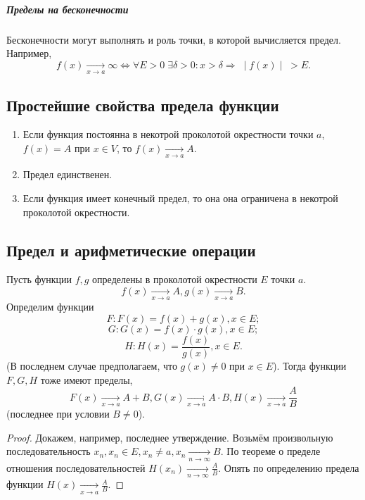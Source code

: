 \subparagraph{Пределы на бесконечности}
Бесконечности могут выполнять и роль точки, в которой вычисляется предел. Например,
$$f(x) \xrightarrow[x\rightarrow a]{} \infty \Leftrightarrow \forall E > 0 \; \exists \delta > 0: x > \delta \Rightarrow \; \mid f(x) \mid \; > E.$$

\subsection{Простейшие свойства предела функции}
\begin{enumerate}
\item Если функция постоянна в некотрой проколотой окрестности точки $a$, $f(x) = A$ при $x \in V$, то $f(x) \xrightarrow[x\rightarrow a]{} A.$
\item Предел единственен.
\item Если функция имеет конечный предел, то она она ограничена в некотрой проколотой окрестности.
\end{enumerate}

\subsection{Предел и арифметические операции}
\begin{Theorem}
Пусть функции $f, g$ определены в проколотой окрестности $E$ точки $a$.
$$f(x) \xrightarrow[x\rightarrow a]{} A, g(x) \xrightarrow[x\rightarrow a]{} B.$$
Определим функции
$$F: F(x) = f(x) + g(x), x \in E;$$
$$G: G(x) = f(x) \cdot g(x), x \in E;$$
$$H: H(x) = \frac{f(x)}{g(x)}, x \in E.$$
(В последнем случае предполагаем, что $g(x) \neq 0$ при $x \in E$).
Тогда функции $F, G, H$ тоже имеют пределы,
$$F(x) \xrightarrow[x\rightarrow a]{} A + B, G(x) \xrightarrow[x\rightarrow a]{} A \cdot B, H(x) \xrightarrow[x\rightarrow a]{} \frac{A}{B}$$
(последнее при условии $B \neq 0$).
\end{Theorem}

\begin{proof}
Докажем, например, последнее утверждение.
Возьмём произвольную последовательность ${x_n}, x_n \in E, x_n \neq a, x_n \xrightarrow[n\rightarrow \infty]{} B.$
По теореме о пределе отношения последовательностей $H(x_n) \xrightarrow[n \rightarrow \infty]{} \frac{A}{B}.$ Опять по определению предела функции $H(x) \xrightarrow[x \rightarrow a]{} \frac{A}{B}.$
\end{proof}

